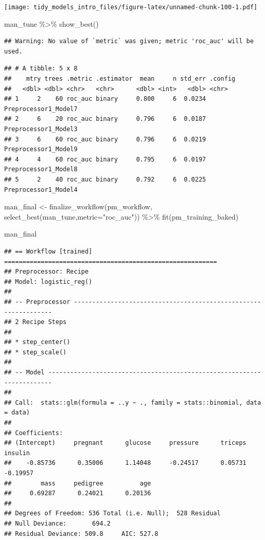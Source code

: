 \documentclass[
]{article}
\newenvironment{Shaded}{\begin{snugshade}}{\end{snugshade}}
\newcommand{\AttributeTok}[1]{\textcolor[rgb]{0.77,0.63,0.00}{#1}}
\newcommand{\FunctionTok}[1]{\textcolor[rgb]{0.00,0.00,0.00}{#1}}
\newcommand{\NormalTok}[1]{#1}
\newcommand{\OtherTok}[1]{\textcolor[rgb]{0.56,0.35,0.01}{#1}}
\newcommand{\SpecialCharTok}[1]{\textcolor[rgb]{0.00,0.00,0.00}{#1}}
\newcommand{\StringTok}[1]{\textcolor[rgb]{0.31,0.60,0.02}{#1}}
\begin{document}
\texttt{[image: tidy\_models\_intro\_files/figure-latex/unnamed-chunk-100-1.pdf]}

\begin{Shaded}
\begin{Highlighting}[]
\NormalTok{man\_tune }\SpecialCharTok{\%\textgreater{}\%} \FunctionTok{show\_best}\NormalTok{()}
\end{Highlighting}
\end{Shaded}

\begin{verbatim}
## Warning: No value of `metric` was given; metric 'roc_auc' will be used.
\end{verbatim}

\begin{verbatim}
## # A tibble: 5 x 8
##    mtry trees .metric .estimator  mean     n std_err .config             
##   <dbl> <dbl> <chr>   <chr>      <dbl> <int>   <dbl> <chr>               
## 1     2    60 roc_auc binary     0.800     6  0.0234 Preprocessor1_Model7
## 2     6    20 roc_auc binary     0.796     6  0.0187 Preprocessor1_Model3
## 3     6    60 roc_auc binary     0.796     6  0.0219 Preprocessor1_Model9
## 4     4    60 roc_auc binary     0.795     6  0.0197 Preprocessor1_Model8
## 5     2    40 roc_auc binary     0.792     6  0.0225 Preprocessor1_Model4
\end{verbatim}

\begin{Shaded}
\begin{Highlighting}[]
\NormalTok{man\_final }\OtherTok{\textless{}{-}} \FunctionTok{finalize\_workflow}\NormalTok{(pm\_workflow,}
                               \FunctionTok{select\_best}\NormalTok{(man\_tune,}\AttributeTok{metric=}\StringTok{"roc\_auc"}\NormalTok{)) }\SpecialCharTok{\%\textgreater{}\%} 
             \FunctionTok{fit}\NormalTok{(pm\_training\_baked)}

\NormalTok{man\_final}
\end{Highlighting}
\end{Shaded}

\begin{verbatim}
## == Workflow [trained] ==========================================================
## Preprocessor: Recipe
## Model: logistic_reg()
## 
## -- Preprocessor ----------------------------------------------------------------
## 2 Recipe Steps
## 
## * step_center()
## * step_scale()
## 
## -- Model -----------------------------------------------------------------------
## 
## Call:  stats::glm(formula = ..y ~ ., family = stats::binomial, data = data)
## 
## Coefficients:
## (Intercept)     pregnant      glucose     pressure      triceps      insulin  
##    -0.85736      0.35006      1.14048     -0.24517      0.05731     -0.19957  
##        mass     pedigree          age  
##     0.69287      0.24021      0.20136  
## 
## Degrees of Freedom: 536 Total (i.e. Null);  528 Residual
## Null Deviance:       694.2 
## Residual Deviance: 509.8     AIC: 527.8
\end{verbatim}
\end{document}
